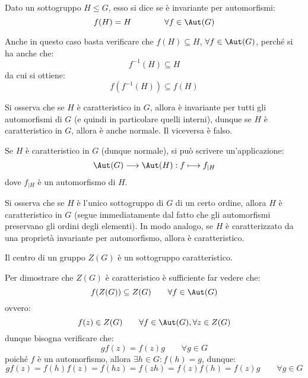 \documentclass[11pt]{scrartcl}
\begin{document}
\begin{definition}
    Dato un sottogruppo $H \leqslant G$, esso si dice  se è invariante per automorfismi:
        \[ f(H) = H
        \qquad \qquad \forall f \in \Aut(G)
            \]
\end{definition}

Anche in questo caso basta verificare che $f(H) \subseteq H$, $\forall f \in \Aut(G)$, perché si ha anche che:
    \[ f^{-1}(H) \subseteq H
        \]
da cui si ottiene:
    \[ f(f^{-1}(H)) \subseteq f(H)
        \]

\begin{remark}
    Si osserva che se $H$ è caratteristico in $G$, allora è invariante per tutti gli automorfismi di $G$ (e quindi in particolare quelli interni), dunque
    se $H$ è caratteristico in $G$, allora è anche normale. Il viceversa è falso.
\end{remark}

\begin{remark}
    Se $H$ è caratteristico in $G$ (dunque normale), si può scrivere un'applicazione:
        \[ \Aut(G) \longrightarrow \Aut(H) : f \longmapsto f_{\mid H}
            \]
    dove $f_{\mid H}$ è un automorfismo di $H$.
\end{remark}

\begin{remark}
    Si osserva che se $H$ è l'unico sottogruppo di $G$ di un certo ordine, allora $H$ è caratteristico in $G$ (segue immediatamente dal fatto che gli automorfismi
    preservano gli ordini degli elementi). In modo analogo, se $H$ è caratterizzato da una proprietà invariante per automorfismo, allora è caratteristico.
\end{remark}

\begin{exercise}
    Il centro di un gruppo $Z(G)$ è un sottogruppo caratteristico.
\end{exercise}
        
\begin{soln}
    Per dimostrare che $Z(G)$ è caratteristico è sufficiente far vedere che:
        \[ f(Z(G)) \subseteq Z(G)
        \qquad \forall f \in \Aut(G)
            \]
    ovvero:
        \[ f(z) \in Z(G)
        \qquad \forall f \in \Aut(G), \forall z \in Z(G)
            \]
    dunque bisogna verificare che:
        \[ gf(z) = f(z)g \qquad \forall g \in G
            \]
    poiché $f$ è un automorfismo, allora $\exists h \in G : f(h) = g$, dunque:
        \[ gf(z) = f(h)f(z) = f(hz) = f(zh) = f(z)f(h) = f(z)g \qquad \forall g \in G
            \]
\end{soln}
\end{document}
